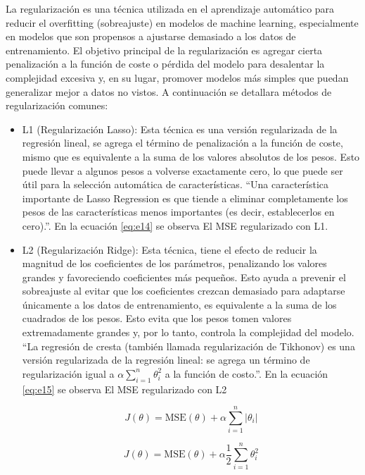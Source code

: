 La regularización es una técnica utilizada en el aprendizaje automático para reducir el overfitting (sobreajuste) en modelos de machine learning, especialmente en modelos que son propensos a ajustarse demasiado a los datos de entrenamiento.
El objetivo principal de la regularización es agregar cierta penalización a la función de coste o pérdida del modelo para desalentar la complejidad excesiva y, en su lugar, promover modelos más simples que puedan generalizar mejor a datos no vistos. A continuación se detallara  métodos de regularización comunes:

\begin{itemize}
	\item L1 (Regularización Lasso): Esta técnica es una versión regularizada de la regresión lineal, se agrega el término de penalización a la función de coste, mismo que  es equivalente a la suma de los valores absolutos de los pesos. Esto puede llevar a algunos pesos a volverse exactamente cero, lo que puede ser útil para la selección automática de características. ``Una característica importante de Lasso Regression es que tiende a eliminar completamente los pesos de las características menos importantes (es decir, establecerlos en cero).''\cite[p. 140]{geron2019hands}. En la ecuación \ref{eq:e14} se observa  El MSE regularizado con L1.
	
	\item L2 (Regularización Ridge): Esta técnica, tiene el efecto de reducir la magnitud de los coeficientes de los parámetros, penalizando los valores grandes y favoreciendo coeficientes más pequeños. Esto ayuda a prevenir el sobreajuste al evitar que los coeficientes crezcan demasiado para adaptarse únicamente a los datos de entrenamiento, es equivalente a la suma de los cuadrados de los pesos. Esto evita que los pesos tomen valores extremadamente grandes y, por lo tanto, controla la complejidad del modelo. ``La regresión de cresta (también llamada regularización de Tikhonov) es una versión regularizada de la regresión lineal: se agrega un término de regularización igual a $ \alpha\sum_{i=1}^{n}  \theta_i^2$ a la función de costo.''\cite[p. 137]{geron2019hands}. En la ecuación \ref{eq:e15} se observa  El MSE regularizado con L2
	
\begin{equation} \label{eq:e14} 
	J(\theta) = \text{MSE}(\theta) + \alpha\sum_{i=1}^{n} \left |  \theta_i \right |
\end{equation}

\begin{equation} \label{eq:e15} 
	J(\theta) = \text{MSE}(\theta) + \alpha\frac{1}{2}\sum_{i=1}^{n} \theta_i^2 
\end{equation}									
				

\end{itemize}

